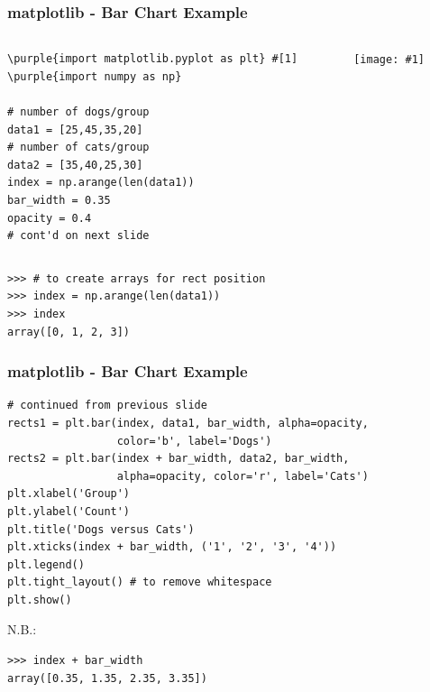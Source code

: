 \documentclass[xcolor=svgnames]{beamer}
\newcommand{\purple}[1]{{\textcolor{purple}{#1}}}
\newcommand{\ipic}[2]{\texttt{[image: \#1]}}
\newcommand{\ft}[1]{\frametitle{#1}}
\begin{document}
\begin{frame}[fragile]\ft{matplotlib - Bar Chart Example}

\begin{columns}[T] %
\begin{column}{.50\textwidth}

\begin{Verbatim}[xleftmargin=.1in, commandchars=\\\{\}, frame=lines ]
\purple{import matplotlib.pyplot as plt} #[1]
\purple{import numpy as np}

# number of dogs/group
data1 = [25,45,35,20]
# number of cats/group
data2 = [35,40,25,30]
index = np.arange(len(data1))
bar_width = 0.35
opacity = 0.4
# cont'd on next slide
\end{Verbatim}
\end{column}%
\hfill%
\begin{column}{.46\textwidth}
\ipic{img/catsdogs.png}{1.0}\end{column}%
\end{columns}

\begin{Verbatim}[xleftmargin=.1in, commandchars=\\\{\}, frame=single] 
>>> # to create arrays for rect position
>>> index = np.arange(len(data1))
>>> index
array([0, 1, 2, 3])
\end{Verbatim}
\end{frame}



\begin{frame}[fragile]\ft{matplotlib - Bar Chart Example}
\begin{Verbatim}[fontsize=\small, commandchars=\\\{\}, frame=single] 
# continued from previous slide
rects1 = plt.bar(index, data1, bar_width, alpha=opacity,
                 color='b', label='Dogs')
rects2 = plt.bar(index + bar_width, data2, bar_width,
                 alpha=opacity, color='r', label='Cats')
plt.xlabel('Group')
plt.ylabel('Count')
plt.title('Dogs versus Cats')
plt.xticks(index + bar_width, ('1', '2', '3', '4'))
plt.legend()
plt.tight_layout() # to remove whitespace
plt.show()
\end{Verbatim}
N.B.:
\begin{Verbatim}[frame=single]
>>> index + bar_width
array([0.35, 1.35, 2.35, 3.35])
\end{Verbatim}

\end{frame}
\end{document}
